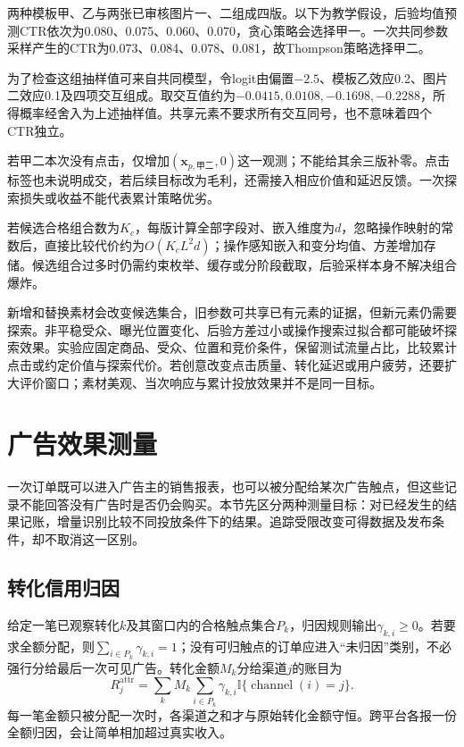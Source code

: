 \begin{example}[四个创意版本的一次选择]
两种模板甲、乙与两张已审核图片一、二组成四版。以下为教学假设，后验均值预测CTR依次为0.080、0.075、0.060、0.070，贪心策略会选择甲一。一次共同参数采样产生的CTR为0.073、0.084、0.078、0.081，故Thompson策略选择甲二。

为了检查这组抽样值可来自共同模型，令logit由偏置$-2.5$、模板乙效应0.2、图片二效应0.1及四项交互组成。取交互值约为$-0.0415,0.0108,-0.1698,-0.2288$，所得概率经舍入为上述抽样值。共享元素不要求所有交互同号，也不意味着四个CTR独立。

若甲二本次没有点击，仅增加$(\bm{x}_{p,\text{甲二}},0)$这一观测；不能给其余三版补零。点击标签也未说明成交，若后续目标改为毛利，还需接入相应价值和延迟反馈。一次探索损失或收益不能代表累计策略优劣。
\end{example}

若候选合格组合数为$K_c$，每版计算全部字段对、嵌入维度为$d$，忽略操作映射的常数后，直接比较代价约为$O(K_cL^2d)$；操作感知嵌入和变分均值、方差增加存储。候选组合过多时仍需约束枚举、缓存或分阶段截取，后验采样本身不解决组合爆炸。

新增和替换素材会改变候选集合，旧参数可共享已有元素的证据，但新元素仍需要探索。非平稳受众、曝光位置变化、后验方差过小或操作搜索过拟合都可能破坏探索效果。实验应固定商品、受众、位置和竞价条件，保留测试流量占比，比较累计点击或约定价值与探索代价。若创意改变点击质量、转化延迟或用户疲劳，还要扩大评价窗口；素材美观、当次响应与累计投放效果并不是同一目标。

\section{广告效果测量}
\label{sec:rs-advertising-measurement}

一次订单既可以进入广告主的销售报表，也可以被分配给某次广告触点，但这些记录不能回答没有广告时是否仍会购买。本节先区分两种测量目标：对已经发生的结果记账，增量识别比较不同投放条件下的结果。追踪受限改变可得数据及发布条件，却不取消这一区别。

\subsection{转化信用归因}
\label{sec:rs-advertising-attribution}

给定一笔已观察转化$k$及其窗口内的合格触点集合$P_k$，归因规则输出$\gamma_{k,i}\geq0$。若要求全额分配，则$\sum_{i\in P_k}\gamma_{k,i}=1$；没有可归触点的订单应进入“未归因”类别，不必强行分给最后一次可见广告。转化金额$M_k$分给渠道$j$的账目为
\[
  R_j^{\mathrm{attr}}
    =\sum_k M_k\sum_{i\in P_k}
       \gamma_{k,i}\mathbb I\{\operatorname{channel}(i)=j\}.
\]
每一笔金额只被分配一次时，各渠道之和才与原始转化金额守恒。跨平台各报一份全额归因，会让简单相加超过真实收入。

